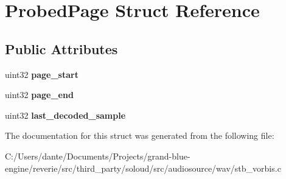 \hypertarget{struct_probed_page}{}\section{Probed\+Page Struct Reference}
\label{struct_probed_page}
\subsection*{Public Attributes}
\begin{DoxyCompactItemize}
\item 
\mbox{\label{struct_probed_page_aaa50c148dd63b1c5582963aab9a987d9}} 
uint32 {\bfseries page\+\_\+start}
\item 
\mbox{\label{struct_probed_page_a70bebe23790fc29c0e904c43e26aac1a}} 
uint32 {\bfseries page\+\_\+end}
\item 
\mbox{\label{struct_probed_page_ad0e2a35e768907ee5f1b7ef9fed20e81}} 
uint32 {\bfseries last\+\_\+decoded\+\_\+sample}
\end{DoxyCompactItemize}


The documentation for this struct was generated from the following file\+:\begin{DoxyCompactItemize}
\item 
C\+:/\+Users/dante/\+Documents/\+Projects/grand-\/blue-\/engine/reverie/src/third\+\_\+party/soloud/src/audiosource/wav/stb\+\_\+vorbis.\+c\end{DoxyCompactItemize}
